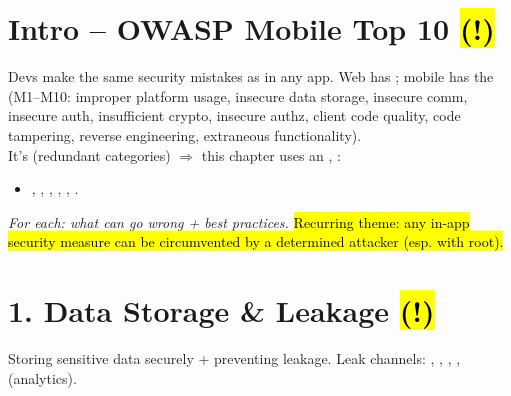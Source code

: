 

\section{Intro -- OWASP Mobile Top 10 \hl{(!)}}
Devs make the same security mistakes as in any app. Web has ; mobile has the  (M1--M10: improper platform usage, insecure data storage, insecure comm, insecure auth, insufficient crypto, insecure authz, client code quality, code tampering, reverse engineering, extraneous functionality).\\
It's  (redundant categories) $\Rightarrow$ this chapter uses an , :
\begin{itemize}
\item {}, , , , , .
\end{itemize}
\textit{For each: what can go wrong + best practices.} \hl{Recurring theme: any in-app security measure can be circumvented by a determined attacker (esp. with root).}

\section{1. Data Storage \& Leakage \hl{(!)}}
Storing sensitive data securely + preventing leakage. Leak channels: , , , ,  (analytics).
